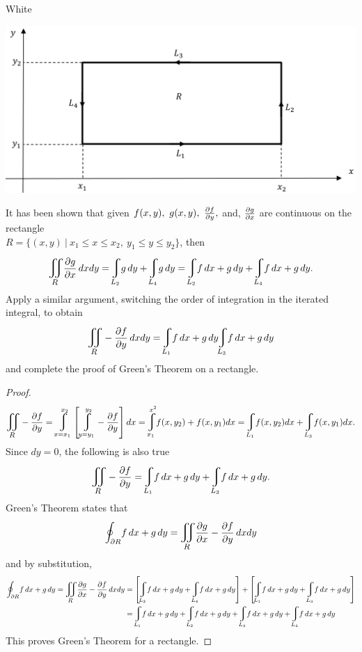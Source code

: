 \documentclass[titlepage]{article}
\begin{document}
\fancyhf{}
\cfoot{\thepage}

\begin{cproblem}{1}{White}
\ \\
\vspace{-1em}
\begin{center}\includegraphics[scale=.75]{rekt.png}\end{center}
It has been shown that given $f(x,y), \ g(x,y), \ \frac{\p f}{\p y},$ and, $\frac{\partial g}{\partial x}$ are continuous on the rectangle \\
$R = \{(x,y) \ | \ x_1 \leq x \leq x_2, \ y_1 \leq y \leq y_2 \}$, then
$$\bigiint{R}{} \frac{\p g}{\p x} \,dx dy = \mlvarint\limits_{L_2} g \,dy + \mlvarint\limits_{L_4} g \,dy = \mlvarint\limits_{L_2} f \,dx + g \,dy + \mlvarint\limits_{L_4} f \,dx + g \,dy.$$
Apply a similar argument, switching the order of integration in the iterated integral, to obtain
$$\bigiint{R}{}-\frac{\p f}{\p y} \,dx dy = \mlvarint_{L_1} f \,dx + g \,dy \mlvarint_{L_3} f\, dx + g\,dy$$
and complete the proof of Green's Theorem on a rectangle.
\end{cproblem}
\begin{proof}
$$\bigiint{R}{} -\frac{\p f}{\p y} = \mlvarint\limits_{x=x_1}^{x_2} \left[ \mlvarint\limits_{y=y_1}^{y_2} -\frac{\p f}{\p y}\right]dx = \mlvarint\limits_{x_1}^{x^2} f(x,y_2) + f(x,y_1) dx = \mlvarint_{L_1} f(x,y_2) dx + \mlvarint_{L_3} f(x,y_1) dx.$$
Since $dy = 0$, the following is also true
$$\bigiint{R}{} -\frac{\p f}{\p y} = \mlvarint_{L_1} f \,dx + g \,dy + \mlvarint_{L_3} f \,dx + g \,dy.$$
Green's Theorem states that 
$$ \mathlarger\oint_{\p R} f\,dx + g\,dy = \bigiint{R}{}\frac{\p g}{\p x} - \frac{\p f}{ \p y}\,dx dy$$
and by substitution,
\begin{align*}
\mathlarger\oint_{\p R} f \,dx + g \, dy = \bigiint{R}{}\frac{\p g}{\p x} -  \frac{\p f}{ \p y}\,dx dy &= \left[ \mlvarint\limits_{L_2} f \,dx + g \,dy + \mlvarint\limits_{L_4} f \,dx + g \,dy\right] + \left[  \mlvarint_{L_1} f \,dx + g \,dy + \mlvarint_{L_3} f \,dx + g \,dy\right] \\ 
&= \mlvarint\limits_{L_1} f \,dx + g \,dy + \mlvarint\limits_{L_2} f \,dx + g \,dy + \mlvarint_{L_3} f \,dx + g \,dy + \mlvarint_{L_4} f \,dx + g \,dy 
\end{align*}
This proves Green's Theorem for a rectangle.
\end{proof} 
\end{document}
